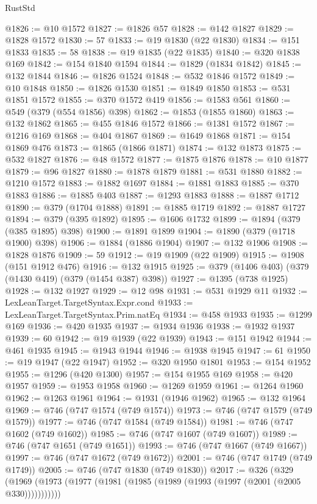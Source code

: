 \begin{lexlean}{RustStd}
\begin{coremodule}
@1826 := @10 @1572
@1827 := @1826 @57
@1828 := @142 @1827
@1829 := @1828 @1572
@1830 := 57
@1833 := @19 @1830 (@22 @1830)
@1834 := @151 @1833
@1835 := 58
@1838 := @19 @1835 (@22 @1835)
@1840 := @320 @1838 @169
@1842 := @154 @1840 @1594
@1844 := @1829 (@1834 @1842)
@1845 := @132 @1844
@1846 := @1826 @1524
@1848 := @532 @1846 @1572
@1849 := @10 @1848
@1850 := @1826 @1530
@1851 := @1849 @1850
@1853 := @531 @1851 @1572
@1855 := @370 @1572 @419
@1856 := @1583 @561
@1860 := @549 (@379 (@554 @1856) @398)
@1862 := @1853 (@1855 @1860)
@1863 := @132 @1862
@1865 := @455 @1846 @1572
@1866 := @1381 @1572
@1867 := @1216 @169
@1868 := @404 @1867
@1869 := @1649 @1868
@1871 := @154 @1869 @476
@1873 := @1865 (@1866 @1871)
@1874 := @132 @1873
@1875 := @532 @1827
@1876 := @48 @1572
@1877 := @1875 @1876
@1878 := @10 @1877
@1879 := @96 @1827
@1880 := @1878 @1879
@1881 := @531 @1880
@1882 := @1210 @1572
@1883 := @1882 @1697
@1884 := @1881 @1883
@1885 := @370 @1883
@1886 := @1885 @403
@1887 := @1293 @1883
@1888 := @1887 @1712
@1890 := @379 (@1704 @1888)
@1891 := @1885 @1719
@1892 := @1887 @1727
@1894 := @379 (@395 @1892)
@1895 := @1606 @1732
@1899 := @1894 (@379 (@385 @1895) @398)
@1900 := @1891 @1899
@1904 := @1890 (@379 (@1718 @1900) @398)
@1906 := @1884 (@1886 @1904)
@1907 := @132 @1906
@1908 := @1828 @1876
@1909 := 59
@1912 := @19 @1909 (@22 @1909)
@1915 := @1908 (@151 @1912 @476)
@1916 := @132 @1915
@1925 := @379 (@1406 @403) (@379 (@1430 @419) (@379 (@1454 @387) @398))
@1927 := @1395 (@738 @1925)
@1928 := @132 @1927
@1929 := @12 @98
@1931 := @531 @1929 @11
@1932 := LexLeanTarget.TargetSyntax.Expr.cond
@1933 := LexLeanTarget.TargetSyntax.Prim.natEq
@1934 := @458 @1933
@1935 := @1299 @169
@1936 := @420 @1935
@1937 := @1934 @1936
@1938 := @1932 @1937
@1939 := 60
@1942 := @19 @1939 (@22 @1939)
@1943 := @151 @1942
@1944 := @461 @1935
@1945 := @1943 @1944
@1946 := @1938 @1945
@1947 := 61
@1950 := @19 @1947 (@22 @1947)
@1952 := @320 @1950 @1801
@1953 := @154 @1952
@1955 := @1296 (@420 @1300)
@1957 := @154 @1955 @169
@1958 := @420 @1957
@1959 := @1953 @1958
@1960 := @1269 @1959
@1961 := @1264 @1960
@1962 := @1263 @1961
@1964 := @1931 (@1946 @1962)
@1965 := @132 @1964
@1969 := @746 (@747 @1574 (@749 @1574))
@1973 := @746 (@747 @1579 (@749 @1579))
@1977 := @746 (@747 @1584 (@749 @1584))
@1981 := @746 (@747 @1602 (@749 @1602))
@1985 := @746 (@747 @1607 (@749 @1607))
@1989 := @746 (@747 @1651 (@749 @1651))
@1993 := @746 (@747 @1667 (@749 @1667))
@1997 := @746 (@747 @1672 (@749 @1672))
@2001 := @746 (@747 @1749 (@749 @1749))
@2005 := @746 (@747 @1830 (@749 @1830))
@2017 := @326
    (@329 (@1969 (@1973 (@1977 (@1981 (@1985 (@1989 (@1993 (@1997 (@2001 (@2005 @330)))))))))))

\end{coremodule}
\end{lexlean}
